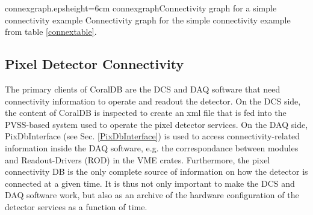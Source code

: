 {connexgraph.eps}{height=6cm}
{connexgraph}{Connectivity graph for a simple connectivity example}
{Connectivity graph for the simple connectivity example from table \ref{connextable}.}



\subsection{Pixel Detector Connectivity}



%
%
%
%
%
%


The primary clients of CoralDB are the DCS and DAQ software that need connectivity information to operate
and readout the detector. On the DCS side, the content of CoralDB is inspected to create
an xml file \cite{dirk} that is fed into the PVSS-based system used to operate the pixel detector 
services.
On the DAQ side, PixDbInterface (see Sec. \ref{PixDbInterface}) is used to access
connectivity-related information inside the DAQ software, e.g. the correspondance between modules and Readout-Drivers (ROD)
in the VME crates. Furthermore, the pixel connectivity DB is the only complete source of information on how the detector
is connected at a given time. It is thus not only important to make the DCS and DAQ software work, but also as 
an archive of the hardware configuration of the detector services as a function of time.

